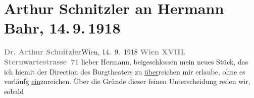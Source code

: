 

         
         \renewcommand{\erwaehntePersonen}{Personen: Leopold von Andrian-Werburg, Hermann Bahr, Clemens von Franckenstein, Robert Michel, Max von Millenkovich, Max Reinhardt}
         \renewcommand{\erwaehnteInstitutionen}{Institutionen: Burgtheater, Nationaltheater München}
         \renewcommand{\erwaehnteOrte}{Orte: München, Partenkirchen, Sternwartestraße, Wien}
         \renewcommand{\erwaehnteWerke}{Werke: Die Schwestern oder Casanova in Spa. Lustspiel in Versen}
               \section[Arthur Schnitzler an Hermann Bahr, 14. 9. 1918]{ Arthur Schnitzler an Hermann Bahr, 14. 9. 1918}\nopagebreak{}\rehead{ }\begin{ledgroupsized}[t]{13cm}\normalsize\beginnumbering \toendnotes[C]{\smallbreak\pagebreak[2]} 
\toendnotes[C]{\smallbreak}\pstart
           \textcolor{gray}{\textbf{{\pb}Dr. Arthur Schnitzler}}\hfill Wien, 14. 9. 1918\pend
           \pstart
           \textcolor{gray}{\textbf{Wien XVIII. Sternwartestrasse 71}}\pend
           \pstart
           lieber Hermann, beigeschlossen mein neues Stück, das ich hiemit der Direction des Burgtheaters zu \uline{über}reichen mir erlaube, ohne es vorläufg \uline{ein}zureichen. Über die Gründe dieser feinen Unterscheidung reden wir, sobald

\end{ledgroupsized}
